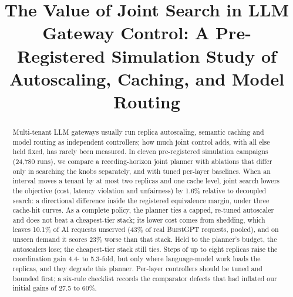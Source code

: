 \documentclass[conference,a4paper]{IEEEtran}
\newif\ifblind
\newif\ifcameraready
\begin{document}
\title{The Value of Joint Search in LLM Gateway Control: A Pre-Registered
Simulation Study of Autoscaling, Caching, and Model Routing}

\ifblind\else
\author{
\and
{}
}
\fi

\newcommand{\copyrightline}{}
\ifcameraready
\IEEEpubid{\makebox[\columnwidth]{\copyrightline\hfill}%
  \hspace{\columnsep}\makebox[\columnwidth]{}}
\fi

\maketitle
\ifcameraready\IEEEpubidadjcol\fi

\begin{abstract}
Multi-tenant LLM gateways usually run replica autoscaling, semantic caching
and model routing as independent controllers; how much joint control adds,
with all else held fixed, has rarely been measured. In eleven pre-registered
simulation campaigns (24{,}780 runs), we compare a receding-horizon joint
planner with ablations that differ only in searching the knobs separately,
and with tuned per-layer baselines. When an interval moves a tenant by at
most two replicas and one cache level, joint search lowers the objective
(cost, latency violation and unfairness) by 1.6\% relative to decoupled
search: a directional difference inside the registered equivalence margin,
under three cache-hit curves. As a complete policy, the planner ties a
capped, re-tuned autoscaler and does not beat a cheapest-tier stack; its
lower cost comes from shedding, which leaves 10.1\% of AI requests unserved
(43\% of real BurstGPT requests, pooled), and on unseen demand it scores 23\%
worse than that stack. Held to the planner's budget, the autoscalers lose;
the cheapest-tier stack still ties. Steps of up to eight replicas raise the
coordination gain 4.4- to 5.3-fold, but only where language-model work loads
the replicas, and they degrade this planner. Per-layer controllers should be
tuned and bounded first; a six-rule checklist records the comparator defects
that had inflated our initial gains of 27.5 to 60\%.
\end{abstract}
\end{document}
